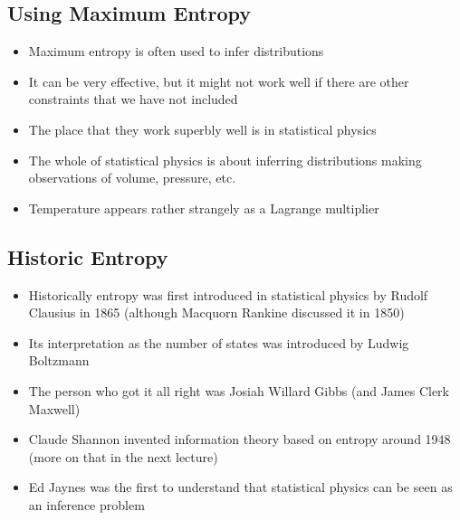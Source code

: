 \begin{slide}
\section{Using Maximum Entropy}

\begin{PauseHighLight}
  \begin{itemize}
  \item Maximum entropy is often used to infer distributions\pause
  \item It can be very effective, but it might not work well if there are
    other constraints that we have not included\pause
  \item The place that they work superbly well is in statistical
    physics\pause
  \item The whole of statistical physics is about inferring
    distributions making observations of volume, pressure, etc.\pause
  \item Temperature appears rather strangely as a Lagrange multiplier\pause
  \end{itemize}
\end{PauseHighLight}

\end{slide}


\begin{slide}
\section[-1]{Historic Entropy}

\begin{PauseHighLight}
  \begin{itemize}
  \item Historically entropy was first introduced in statistical
    physics by Rudolf Clausius in 1865 (although Macquorn Rankine
    discussed it in 1850)\pause
  \item Its interpretation as the number of states was introduced by
    Ludwig Boltzmann\pause
  \item The person who got it all right was Josiah Willard Gibbs (and
    James Clerk Maxwell)\pause
  \item Claude Shannon invented information theory based on entropy
    around 1948 (more on that in the next lecture)\pause
  \item Ed Jaynes was the first to understand that statistical physics
    can be seen as an inference problem\pause
  \end{itemize}
\end{PauseHighLight}

\end{slide}

